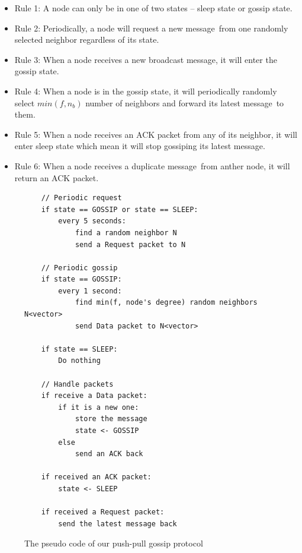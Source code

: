 \documentclass[onehalf,11pt]{beavtex}
\newcommand{\gp}{gossip protocol}
\newcommand{\msg}{message}
\begin{document}
\begin{itemize}
	\item Rule 1: A node can only be in one of two states -- sleep state or gossip state.
	\item Rule 2: Periodically, a node will request a new \msg ~from one randomly selected neighbor regardless of its state.
	\item Rule 3: When a node receives a new broadcast \msg, it will enter the gossip state.
	\item Rule 4: When a node is in the gossip state, it will periodically randomly select $min(f, n_b)$ number of neighbors and forward its latest \msg ~to them.
	\item Rule 5: When a node receives an ACK packet from any of its neighbor, it will enter sleep state which mean it will stop gossiping its latest \msg.
	\item Rule 6: When a node receives a duplicate \msg ~from anther node, it will return an ACK packet. 
\end{itemize}

\begin{figure}[!htbp]
	\centering
	\begin{Verbatim}
	// Periodic request 
	if state == GOSSIP or state == SLEEP:
		every 5 seconds:
			find a random neighbor N
			send a Request packet to N
	
	// Periodic gossip	
	if state == GOSSIP:
		every 1 second:
			find min(f, node's degree) random neighbors N<vector>
			send Data packet to N<vector>
	
	if state == SLEEP:
		Do nothing
	
	// Handle packets
	if receive a Data packet:
		if it is a new one:
			store the message
			state <- GOSSIP
		else
			send an ACK back

	if received an ACK packet:
		state <- SLEEP

	if received a Request packet:
		send the latest message back	
	\end{Verbatim}
	\caption{The pseudo code of our push-pull \gp}
	\label{fig:pseudo}
\end{figure}
\end{document}
